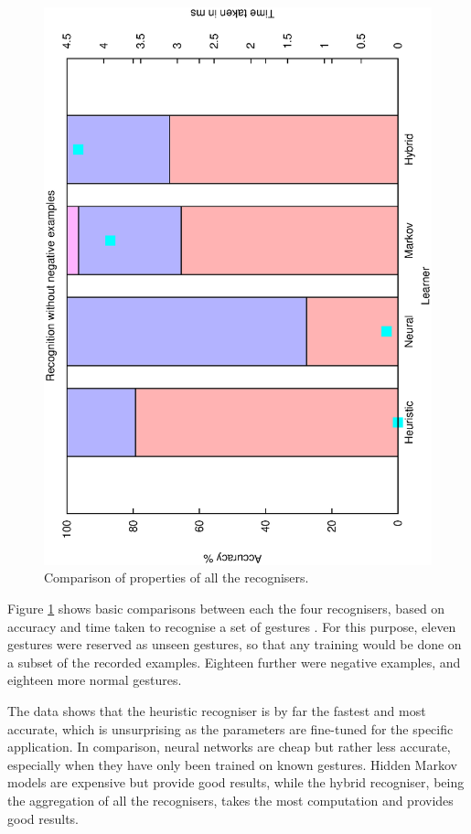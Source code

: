 \documentclass[12pt,a4,notitlepage]{report}
\renewcommand{\_}{\texttt{\symbol{95}}}
\newcommand{\<}{\texttt{\symbol{60}}}
\renewcommand{\>}{\texttt{\symbol{62}}}
\begin{document}
\begin{figure}
\includegraphics[scale=0.3,angle=-90]{results/all/no-neg.ps}
\caption{Comparison of properties of all the recognisers.}
\label{all_recognisers}
\end{figure}

Figure \ref{all_recognisers} shows basic comparisons between each the four recognisers, based on accuracy and time taken to recognise a set of gestures . For this purpose, eleven gestures were reserved as unseen gestures, so that any training would be done on a subset of the recorded examples. Eighteen further were negative examples, and eighteen more normal gestures.

The data shows that the heuristic recogniser is by far the fastest and most accurate, which is unsurprising as the parameters are fine-tuned for the specific application. In comparison, neural networks are cheap but rather less accurate, especially when they have only been trained on known gestures. Hidden Markov models are expensive but provide good results, while the hybrid recogniser, being the aggregation of all the recognisers, takes the most computation and provides good results.
\end{document}
